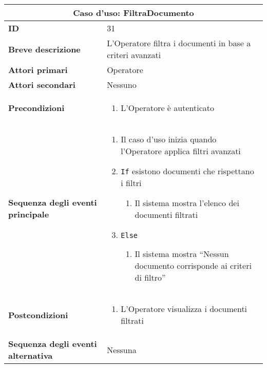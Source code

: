 \documentclass[a4paper]{report}
\begin{document}
\clearpage
\begin{table}[H]
\vspace*{-0cm}
\renewcommand{\arraystretch}{1.9}
\begin{tabular}{|p{3.9cm}|p{9.9cm}|}
\hline
\multicolumn{2}{|c|}{\textbf{Caso d’uso: FiltraDocumento}} \\ \hline
	\textbf{ID} & 31 \\ \hline
	\textbf{Breve descrizione} & L'Operatore filtra i documenti in base a criteri avanzati \\ \hline
	\textbf{Attori primari} & Operatore  \\ \hline
	\textbf{Attori secondari} & Nessuno \\ \hline
	\textbf{Precondizioni} & \begin{enumerate}[leftmargin=14pt,label=\arabic*.,labelsep=0.5em,topsep=0pt,partopsep=0pt,parsep=0pt,itemsep=0pt]
        \item L’Operatore è autenticato
    \end{enumerate} \\ \hline
	\textbf{Sequenza degli eventi principale} & 
\begin{enumerate}[leftmargin=14pt,label=\arabic*.,labelsep=0.5em,topsep=0pt,partopsep=0pt,parsep=0pt,itemsep=0pt]
    \item Il caso d’uso inizia quando l’Operatore applica filtri avanzati
    \item \texttt{If} esistono documenti che rispettano i filtri
    \begin{enumerate}[label=\arabic{enumi}.\arabic*.,leftmargin=22pt,labelsep=0.5em,topsep=0pt,partopsep=0pt,parsep=0pt,itemsep=0pt]
        \item Il sistema mostra l'elenco dei documenti filtrati
    \end{enumerate}
    \item \texttt{Else}
    \begin{enumerate}[label=\arabic{enumi}.\arabic*.,leftmargin=22pt,labelsep=0.5em,topsep=0pt,partopsep=0pt,parsep=0pt,itemsep=0pt]
        \item Il sistema mostra “Nessun documento corrisponde ai criteri di filtro”
    \end{enumerate}
\end{enumerate}\\ \hline
	\textbf{Postcondizioni} & \begin{enumerate}[label=\arabic*.,leftmargin=14pt,labelsep=0.5em,topsep=0pt,partopsep=0pt,parsep=0pt,itemsep=0pt]
        \item L’Operatore visualizza i documenti filtrati
    \end{enumerate} \\ \hline
	\textbf{Sequenza degli eventi alternativa} & Nessuna \\ \hline
\end{tabular}
\end{table}
\end{document}
